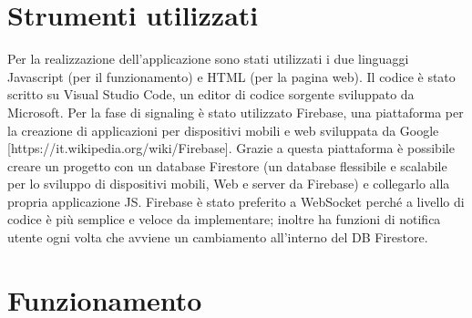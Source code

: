 \documentclass[11pt, a4paper, openany]{book}
\begin{document}
  	\section{Strumenti utilizzati}
	Per la realizzazione dell'applicazione sono stati utilizzati i due linguaggi Javascript (per il funzionamento) e HTML (per la pagina web). Il codice è stato scritto su Visual Studio Code, un editor di codice sorgente sviluppato da Microsoft. Per la fase di signaling è stato utilizzato Firebase, una piattaforma per la creazione di applicazioni per dispositivi mobili e web sviluppata da Google [https://it.wikipedia.org/wiki/Firebase]. Grazie a questa piattaforma è possibile creare un progetto con un database Firestore (un database flessibile e scalabile per lo sviluppo di dispositivi mobili, Web e server da Firebase) e collegarlo alla propria applicazione JS. Firebase è stato preferito a WebSocket perché a livello di codice è più semplice e veloce da implementare; inoltre ha funzioni di notifica utente ogni volta che avviene un cambiamento all'interno del DB Firestore.
	
	\newpage
	 
  	\section{Funzionamento}
\end{document}
